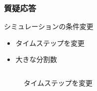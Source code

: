 \documentclass[aspectratio=169,dvipdfmx,hyperref={bookmarks=true}]{beamer}
\begin{document}
\begin{thebibliography}{99}
 \begin{frame}
 \frametitle{質疑応答}
\begin{block}{シミュレーションの条件変更}
\begin{itemize}
	\item タイムステップを変更
	\item 大きな分割数
\end{itemize}
\end{block}
\begin{columns}
    \begin{column}{0.33\textwidth}
   \begin{figure}
\caption{タイムステップを変更}
   \end{figure}
    \end{column}
    \begin{column}{0.33\textwidth}
       \begin{figure}

\end{figure}
\end{column}
\end{columns}
\end{frame}
\end{thebibliography}
\end{document}
